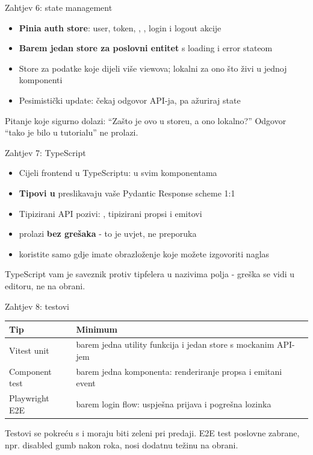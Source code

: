 \begin{frame}{Zahtjev 6: state management}
\begin{itemize}
  \item \textbf{Pinia auth store}: user, token, , , login i logout akcije
  \item \textbf{Barem jedan store za poslovni entitet} s loading i error stateom
  \item Store za podatke koje dijeli više viewova; lokalni  za ono što živi u jednoj komponenti
  \item Pesimistički update: čekaj odgovor API-ja, pa ažuriraj state
\end{itemize}

\vspace{0.4em}
Pitanje koje sigurno dolazi: \enquote{Zašto je ovo u storeu, a ono lokalno?} Odgovor \enquote{tako je bilo u tutorialu} ne prolazi.
\end{frame}

\begin{frame}{Zahtjev 7: TypeScript}
\begin{itemize}
  \item Cijeli frontend u TypeScriptu:  u svim komponentama
  \item \textbf{Tipovi u } preslikavaju vaše Pydantic Response scheme 1:1
  \item Tipizirani API pozivi: , tipizirani propsi i emitovi
  \item {} prolazi \textbf{bez grešaka} - to je uvjet, ne preporuka
  \item {} koristite samo gdje imate obrazloženje koje možete izgovoriti naglas
\end{itemize}

\vspace{0.4em}
TypeScript vam je saveznik protiv tipfelera u nazivima polja - greška se vidi u editoru, ne na obrani.
\end{frame}

\begin{frame}{Zahtjev 8: testovi}
\begin{tabular}{@{}lp{6.8cm}@{}}
  \toprule
  \textbf{Tip} & \textbf{Minimum} \\
  \midrule
  Vitest unit & barem jedna utility funkcija i jedan store s mockanim API-jem \\
  Component test & barem jedna komponenta: renderiranje propsa i emitani event \\
  Playwright E2E & barem login flow: uspješna prijava i pogrešna lozinka \\
  \bottomrule
\end{tabular}

\vspace{0.6em}
Testovi se pokreću s  i moraju biti zeleni pri predaji. E2E test poslovne zabrane, npr. disabled gumb nakon roka, nosi dodatnu težinu na obrani.
\end{frame}

